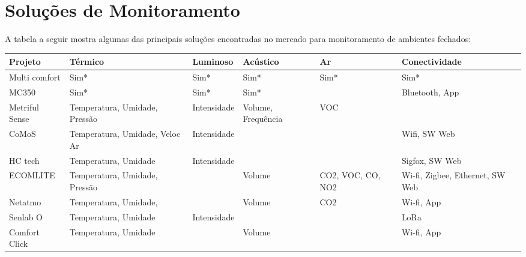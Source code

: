 \documentclass[monografia.tex]{subfiles}
\begin{document}


\section{Soluções de Monitoramento} %

A tabela a seguir mostra algumas das principais soluções encontradas no mercado para monitoramento de ambientes fechados: 

\begin{center}
\begin{tabular}{ | m{2.5cm} | m{2.4cm}| m{2.2cm} |m{2cm} |m{2.1cm} |m{2.8cm} | } 
\hline
\textbf{Projeto} & \textbf{Térmico} & \textbf{Luminoso} & \textbf{Acústico} & \textbf{Ar} & \textbf{Conectividade} \\ 
\hline
Multi comfort \cite{multicomfort} & Sim* & Sim* & Sim* & Sim* & Sim* \\ \hline
MC350\cite{mc350} & Sim* & Sim* & Sim* & & Bluetooth, App \\
\hline
Metriful Sense\cite{metriful} & Temperatura, Umidade, Pressão & Intensidade & Volume, Frequência & VOC &  \\ \hline
CoMoS\cite{CoMoS} & Temperatura, Umidade, Veloc Ar & Intensidade & & & Wifi, SW Web \\ \hline
HC tech\cite{HCTech} & Temperatura, Umidade & Intensidade & & & Sigfox, SW Web \\ \hline
ECOMLITE \cite{ECOMLITE} & Temperatura, Umidade, Pressão & & Volume & CO2, VOC, CO, NO2 & Wi-fi, Zigbee, Ethernet, SW Web \\ \hline
Netatmo\cite{netatmo} & Temperatura, Umidade, & & Volume & CO2 & Wi-fi, App \\ \hline
Senlab O\cite{Senlab} & Temperatura, Umidade & Intensidade & & & LoRa \\ \hline
Comfort Click\cite{comfortclick} & Temperatura, Umidade & & Volume & & Wi-fi, App  \\ \hline
\end{tabular}
\end{center}
\end{document}

